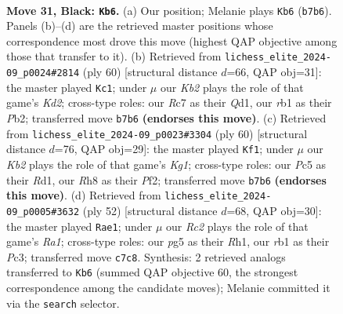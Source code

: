 \documentclass[11pt]{article}
\begin{document}
\clearpage

\begin{figure}[p]\centering
\begin{subfigure}{0.46\textwidth}\centering
\resizebox{\linewidth}{!}{%
\newchessgame
\chessboard[
  setfen={4Q1nr/1kr3p1/8/2p3Pp/2P2P1q/N7/PP4K1/1RB5 b - - 0 31},
  showmover=false,
  pgfstyle=straightmove, color=movearrow, markmove={b7-b6}
]}
\caption{}
\end{subfigure}\hfill
\begin{subfigure}{0.46\textwidth}\centering
\resizebox{\linewidth}{!}{%
\newchessgame
\chessboard[
  setfen={5rk1/1p4bp/1N1p4/1R1Pn3/6pq/3B1p2/1P1K3P/3Q3R w - - 0 31},
  showmover=false,
  pgfstyle=straightmove, color=movearrow, markmove={d2-c1}
]}
\caption{}
\end{subfigure}
\\[4pt]
\begin{subfigure}{0.46\textwidth}\centering
\resizebox{\linewidth}{!}{%
\newchessgame
\chessboard[
  setfen={3r1bk1/6p1/r5pp/p1n1B3/1p1N4/1P5P/1P3PP1/3RR1K1 w - - 1 31},
  showmover=false,
  pgfstyle=straightmove, color=movearrow, markmove={g1-f1}
]}
\caption{}
\end{subfigure}\hfill
\begin{subfigure}{0.46\textwidth}\centering
\resizebox{\linewidth}{!}{%
\newchessgame
\chessboard[
  setfen={r7/2p1N1p1/p2p1k2/1pb3pQ/4q3/2P5/P2K1P1P/R6R w - - 2 27},
  showmover=false,
  pgfstyle=straightmove, color=movearrow, markmove={a1-e1}
]}
\caption{}
\end{subfigure}
\caption{\textbf{Move 31, Black: \texttt{Kb6}.} (a) Our position; Melanie plays \texttt{Kb6} (\texttt{b7b6}). Panels (b)--(d) are the retrieved master positions whose correspondence most drove this move (highest QAP objective among those that transfer to it). (b) Retrieved from \texttt{lichess\_elite\_2024-09\_p0024\#2814} (ply 60) [structural distance $d$=66, QAP obj=31]: the master played \texttt{Kc1}; under $\mu$ our \emph{Kb2} plays the role of that game's \emph{Kd2}; cross-type roles: our \emph{R}c7 as their \emph{Q}d1, our \emph{r}b1 as their \emph{P}b2; transferred move \texttt{b7b6} \textbf{(endorses this move)}. (c) Retrieved from \texttt{lichess\_elite\_2024-09\_p0023\#3304} (ply 60) [structural distance $d$=76, QAP obj=29]: the master played \texttt{Kf1}; under $\mu$ our \emph{Kb2} plays the role of that game's \emph{Kg1}; cross-type roles: our \emph{P}c5 as their \emph{R}d1, our \emph{R}h8 as their \emph{P}f2; transferred move \texttt{b7b6} \textbf{(endorses this move)}. (d) Retrieved from \texttt{lichess\_elite\_2024-09\_p0005\#3632} (ply 52) [structural distance $d$=68, QAP obj=30]: the master played \texttt{Rae1}; under $\mu$ our \emph{Rc2} plays the role of that game's \emph{Ra1}; cross-type roles: our \emph{p}g5 as their \emph{R}h1, our \emph{r}b1 as their \emph{P}c3; transferred move \texttt{c7c8}. Synthesis: 2 retrieved analogs transferred to \texttt{Kb6} (summed QAP objective 60, the strongest correspondence among the candidate moves); Melanie committed it via the \texttt{search} selector.}
\label{fig:thought-m61}
\end{figure}
\end{document}
